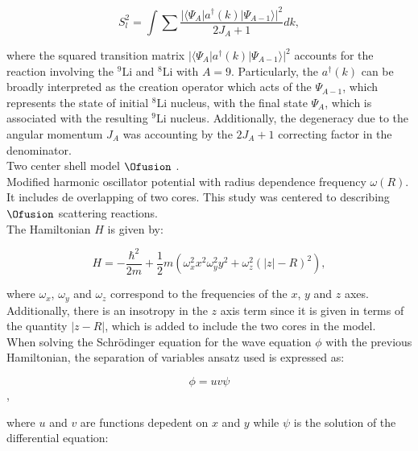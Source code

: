\documentclass[openany]{book}
\begin{document}
\begin{equation}\label{eq:micro_shellGamow_spectroscopic}
	S^2_{l} = \int {\sum \frac{|\langle \Psi_A | a^{\dagger}(k)| \Psi_{A-1} \rangle |^2}{2J_A + 1}} dk,
\end{equation}

where the squared transition matrix $|\langle \Psi_A | a^{\dagger}(k)| \Psi_{A-1} \rangle |^2$ accounts for the reaction involving the $\mathrm{{}^{9}Li}$ and $\mathrm{{}^{8}Li}$ with $A = 9$. Particularly, the $a^{\dagger}(k)$ can be broadly interpreted as the creation operator which acts of the $\Psi_{A-1}$, which represents the state of initial $\mathrm{{}^{8}Li}$ nucleus, with the final state $\Psi_{A}$, which is associated with the resulting  $\mathrm{{}^{9}Li}$ nucleus. Additionally, the degeneracy due to the angular momentum $J_A$ was accounting by the $2J_A + 1 $  correcting factor in the denominator. \\


Two center shell model $\Ofusion$ \cite{tazawa_1974}. \\

Modified harmonic oscillator potential with radius dependence frequency $\omega(R)$. It includes de overlapping of two cores. This study was centered to describing $\Ofusion$ scattering reactions. \\

The Hamiltonian $H$ is given by: 

\begin{equation}\label{eq:micro_twoCenterShell_Hamltonian}
	H = -\frac{\hbar^2}{2m} + \frac{1}{2}m (\omega^2_x  x^2  \omega^2_y y^2 + \omega^2_z (|z| - R)^2),
\end{equation}

where $\omega_x$, $\omega_y$ and $\omega_z$ correspond to the frequencies of the $x$, $y$ and $z$ axes. Additionally, there is an insotropy in the $z$ axis term since it is given in terms of the quantity $|z-R|$, which is added to include the two cores in the model. \\

When solving the Schrödinger equation for the wave equation $\phi$ with the previous Hamiltonian, the separation of variables ansatz used is expressed as: 

\begin{equation}\label{eq:micro_twoCenterShell_anzats}
	\phi = u v \psi
\end{equation},

where $u$ and $v$ are functions depedent on $x$ and $y$ while $\psi$ is the solution of the differential equation: 
\end{document}
